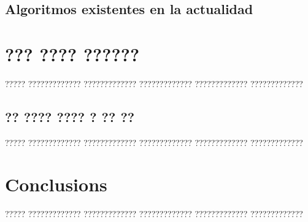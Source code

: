 \documentclass[11pt,spanish,listoffigures,listoftables]{tfgetsinf}
\begin{document}
\section{Algoritmos existentes en la actualidad}



\chapter{??? ???? ??????}

????? ????????????? ????????????? ????????????? ????????????? ????????????? 

\section{?? ???? ???? ? ?? ??}

????? ????????????? ????????????? ????????????? ????????????? ?????????????


\chapter{Conclusions}

????? ????????????? ????????????? ????????????? ????????????? ????????????? 

\end{document}
